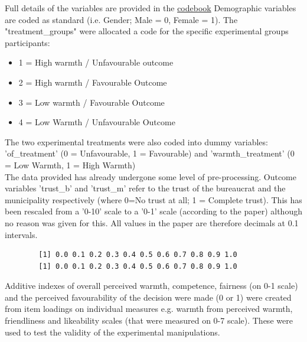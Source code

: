 \documentclass[12pt,letterpaper]{article}
\begin{document}
	Full details of the variables are provided in the \href{https://dataverse.harvard.edu/file.xhtml?fileId=4864294&version=1.0}{codebook} 
	Demographic variables are coded as standard (i.e. Gender; Male = 0, Female = 1). 
	The "treatment\_groups" were allocated a code for the specific experimental groups participants: \\
		\begin{itemize}
			\item 1 = High warmth / Unfavourable outcome
			\item 2 = High warmth / Favourable Outcome
			\item 3 = Low warmth / Favourable Outcome
			\item 4 = Low Warmth / Unfavourable Outcome
		\end{itemize} 
	The two experimental treatments were also coded into dummy variables: 'of\_treatment' (0 = Unfavourable, 1 = Favourable) and 'warmth\_treatment' (0 = Low Warmth, 1 = High Warmth) \\
	
	
	The data provided has already undergone some level of pre-processing. Outcome variables 'trust\_b' and 'trust\_m' refer to the trust of the bureaucrat and the municipality respectively (where 0=No trust at all; 1 = Complete trust). This has been rescaled from a '0-10' scale to a '0-1' scale (according to the paper) although no reason was given for this. All values in the paper are therefore decimals at 0.1 intervals.
	 
	\begin{Verbatim}
		[1] 0.0 0.1 0.2 0.3 0.4 0.5 0.6 0.7 0.8 0.9 1.0
		[1] 0.0 0.1 0.2 0.3 0.4 0.5 0.6 0.7 0.8 0.9 1.0
	\end{Verbatim}
	Additive indexes of overall perceived warmth, competence, fairness (on 0-1 scale) and the perceived favourability of the decision were made (0 or 1) were created from item loadings on individual measures e.g. warmth from perceived warmth, friendliness and likeability scales (that were measured on 0-7 scale). These were used to test the validity of the experimental manipulations. 
	
	
\vspace{1cm}
\end{document}
